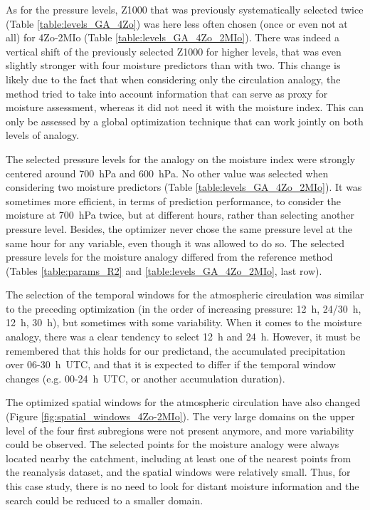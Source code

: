 \documentclass[review]{elsarticle}
\begin{document}
As for the pressure levels, Z1000 that was previously systematically selected twice (Table \ref{table:levels_GA_4Zo}) was here less often chosen (once or even not at all) for 4Zo-2MIo (Table \ref{table:levels_GA_4Zo_2MIo}). There was indeed a vertical shift of the previously selected Z1000 for higher levels, that was even slightly stronger with four moisture predictors than with two. This change is likely due to the fact that when considering only the circulation analogy, the method tried to take into account information that can serve as proxy for moisture assessment, whereas it did not need it with the moisture index. This can only be assessed by a global optimization technique that can work jointly on both levels of analogy. 

The selected pressure levels for the analogy on the moisture index were strongly centered around 700~hPa and 600~hPa. No other value was selected when considering two moisture predictors (Table \ref{table:levels_GA_4Zo_2MIo}). It was sometimes more efficient, in terms of prediction performance, to consider the moisture at 700~hPa twice, but at different hours, rather than selecting another pressure level. Besides, the optimizer never chose the same pressure level at the same hour for any variable, even though it was allowed to do so. The selected pressure levels for the moisture analogy differed from the reference method (Tables \ref{table:params_R2} and \ref{table:levels_GA_4Zo_2MIo}, last row).

The selection of the temporal windows for the atmospheric circulation was similar to the preceding optimization (in the order of increasing pressure: 12~h, 24/30~h, 12~h, 30~h), but sometimes with some variability. When it comes to the moisture analogy, there was a clear tendency to select 12~h and 24~h. However, it must be remembered that this holds for our predictand, the accumulated precipitation over 06-30~h~UTC, and that it is expected to differ if the temporal window changes (e.g. 00-24~h~UTC, or another accumulation duration).

The optimized spatial windows for the atmospheric circulation have also changed (Figure \ref{fig:spatial_windows_4Zo-2MIo}). The very large domains on the upper level of the four first subregions were not present anymore, and more variability could be observed. The selected points for the moisture analogy were always located nearby the catchment, including at least one of the nearest points from the reanalysis dataset, and the spatial windows were relatively small. Thus, for this case study, there is no need to look for distant moisture information and the search could be reduced to a smaller domain. 
\end{document}
